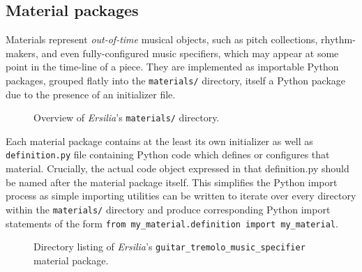 \subsection{Material packages}
\label{ssec:material-packages}

Materials represent \emph{out-of-time} musical objects, such as pitch
collections, rhythm-makers, and even fully-configured music specifiers, which
may appear at some point in the time-line of a piece. They are implemented as
importable Python packages, grouped flatly into the \texttt{materials/}
directory, itself a Python package due to the presence of an initializer file.

\begin{figure}[h!]
\begin{singlespacing}
\vspace{-0.5\baselineskip}
\end{singlespacing}
\caption{Overview of \emph{Ersilia}'s \texttt{materials/} directory.}
\end{figure}

Each material package contains at the least its own initializer as well as
\texttt{definition.py} file containing Python code which defines or configures
that material. Crucially, the actual code object expressed in that
definition.py should be named after the material package itself. This
simplifies the Python import process as simple importing utilities can be
written to iterate over every directory within the \texttt{materials/}
directory and produce corresponding Python import statements of the form
\texttt{from my_material.definition import my_material}.

\begin{figure}[h!]
\begin{singlespacing}
\vspace{-0.5\baselineskip}
\end{singlespacing}
\caption{Directory listing of \emph{Ersilia}'s
\texttt{guitar\_tremolo\_music\_specifier} material package.}
\end{figure}


